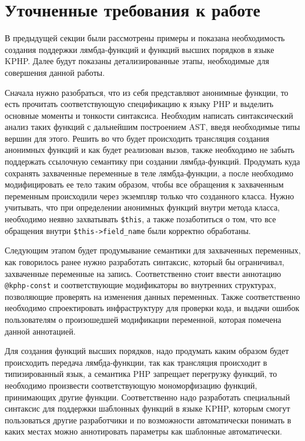 \section{Уточненные требования к работе}
В предыдущей секции были рассмотрены примеры и показана необходимость создания поддержки лямбда-функций и функций высших порядков в языке KPHP. Далее будут показаны детализированные этапы, необходимые для совершения данной работы.

Сначала нужно разобраться, что из себя представляют анонимные функции, то есть прочитать соответствующую спецификацию к языку PHP и выделить основные моменты и тонкости синтаксиса.
Необходим написать синтаксический анализ таких функций с дальнейшим построением AST, введя необходимые типы вершин для этого.
Решить во что будет происходить трансляция создания анонимных функций и как будет реализован вызов, также необходимо не забыть поддержать ссылочную семантику при создании лямбда-функций.
Продумать куда сохранять захваченные переменные в теле лямбда-функции, а после необходимо модифицировать ее тело таким образом, чтобы все обращения к захваченным переменным происходили через экземпляр только что созданного класса.
Нужно учитывать, что при определении анонимных функций внутри метода класса, необходимо неявно захватывать \verb|$this|, а также позаботиться о том, что все обращения внутри \verb|$this->field_name| были корректно обработаны.

Следующим этапом будет продумывание семантики для захваченных переменных, как говорилось ранее нужно разработать синтаксис, который бы ограничивал, захваченные переменные на запись.
Соответственно стоит ввести аннотацию \verb|@kphp-const| и соответствующие модификаторы во внутренних структурах, позволяющие проверять на изменения данных переменных.
Также соответственно необходимо спроектировать инфраструктуру для проверки кода, и выдачи ошибок пользователям о произошедшей модификации переменной, которая помечена данной аннотацией.

Для создания функций высших порядков, надо продумать каким образом будет происходить передача лямбда-функции, так как трансляция происходит в типизированный язык, а семантика PHP запрещает перегрузку функций, то необходимо произвести соответствующую мономорфизацию функций, принимающих другие функции.
Соответственно надо разработать специальный синтаксис для поддержки шаблонных функций в языке KPHP, которым смогут пользоваться другие разработчики и по возможности автоматически понимать в каких местах можно аннотировать параметры как шаблонные автоматически.

